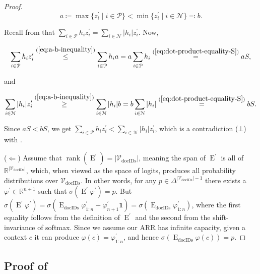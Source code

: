 \documentclass[11pt, a4paper, onecolumn, confidential, copyright, gdm]{google}
\newcommand{\Edocids}{\operatorname{E}_{\text{docIDs}}}
\newcommand{\Eprime}{\operatorname{E}^{\prime}}
\newcommand{\Vdocids}{\mathscr{V}_{\text{docIDs}}}
\begin{document}
\begin{proof}
\begin{equation}\label{eq:a-b-inequality}
a \coloneqq  \max \{z^\prime_i \mid i \in \mathcal{P}\} < \min \{z^\prime_i \mid i \in \mathcal{N}\} \eqqcolon b.
\end{equation}

\noindent Recall from  that $\sum_{i \in \mathcal{P}}h_i z^\prime_i = \sum_{i \in \mathcal N}|h_i| z^\prime_i$. Now,

\begin{equation}\label{eq:inequality-aS}
\sum_{i \in \mathcal{P}}h_i z^\prime_i \overset{(\ref{eq:a-b-inequality})}{\leq} \sum_{i \in \mathcal{P}}h_i a = a\sum_{i \in \mathcal{P}}h_i \overset{(\ref{eq:dot-product-equality-S})}{=} aS,
\end{equation}

\noindent and

\begin{equation}\label{eq:inequality-bS}
\sum_{i \in \mathcal{N}}|h_i| z^\prime_i \overset{(\ref{eq:a-b-inequality})}{\geq} \sum_{i \in \mathcal{N}}|h_i| b = b\sum_{i \in \mathcal{N}}|h_i| \overset{(\ref{eq:dot-product-equality-S})}{=} bS.
\end{equation}

\noindent Since $aS < bS$, we get $\sum_{i \in \mathcal{P}}h_i z^\prime_i < \sum_{i \in \mathcal{N}}|h_i| z^\prime_i$, which is a contradiction ($\bot$) with .

($\Leftarrow$) Assume that $\operatorname{rank}(\Eprime) = |\Vdocids|$, meaning the span of $\Eprime$ is all of $\mathbb{R}^{|\Vdocids|}$, which, when viewed as the space of logits, produces all probability distributions over $\Vdocids$. In other words, for any $p \in \Delta^{|\Vdocids|-1}$ there exists a $\varphi^\prime \in \mathbb{R}^{n+1}$ such that $\sigma(\Eprime \varphi^\prime) = p$. But $\sigma(\Eprime \varphi^\prime) = \sigma(\Edocids \varphi^\prime_{1:n} + \varphi^\prime_{n+1}\mathbf{1}) = \sigma(\Edocids \varphi^\prime_{1:n})$, where the first equality follows from the definition of $\Eprime$ and the second from the shift-invariance of softmax. Since we assume our ARR has infinite capacity, given a context $c$ it can produce $\varphi(c) = \varphi^\prime_{1:n}$, and hence $\sigma(\Edocids \varphi(c)) = p$.
\end{proof}

\subsection{Proof of }
\end{document}
